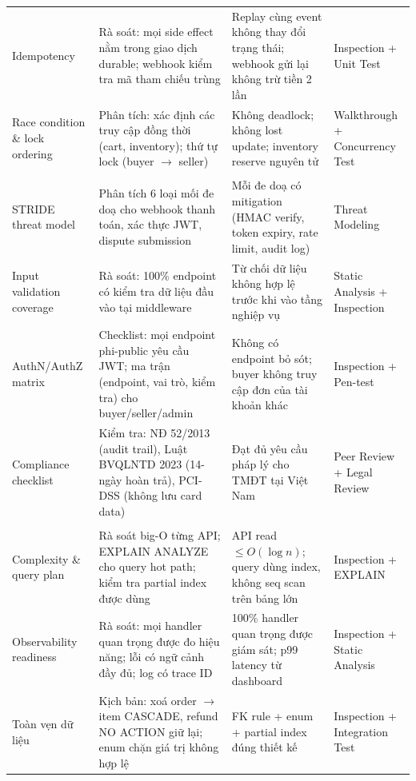 \begin{longtable}{@{}L{3.3cm}L{5.3cm}L{4.2cm}L{2.2cm}@{}}
Idempotency & Rà soát: mọi side effect nằm trong giao dịch durable; webhook kiểm tra mã tham chiếu trùng & Replay cùng event không thay đổi trạng thái; webhook gửi lại không trừ tiền 2 lần & Inspection + Unit Test \\
Race condition \& lock ordering & Phân tích: xác định các truy cập đồng thời (cart, inventory); thứ tự lock (buyer $\to$ seller) & Không deadlock; không lost update; inventory reserve nguyên tử & Walkthrough + Concurrency Test \\
\addlinespace
{} \\
STRIDE threat model & Phân tích 6 loại mối đe doạ cho webhook thanh toán, xác thực JWT, dispute submission & Mỗi đe doạ có mitigation (HMAC verify, token expiry, rate limit, audit log) & Threat Modeling \\
Input validation coverage & Rà soát: 100\% endpoint có kiểm tra dữ liệu đầu vào tại middleware & Từ chối dữ liệu không hợp lệ trước khi vào tầng nghiệp vụ & Static Analysis + Inspection \\
AuthN/AuthZ matrix & Checklist: mọi endpoint phi-public yêu cầu JWT; ma trận (endpoint, vai trò, kiểm tra) cho buyer/seller/admin & Không có endpoint bỏ sót; buyer không truy cập đơn của tài khoản khác & Inspection + Pen-test \\
Compliance checklist & Kiểm tra: NĐ 52/2013 (audit trail), Luật BVQLNTD 2023 (14-ngày hoàn trả), PCI-DSS (không lưu card data) & Đạt đủ yêu cầu pháp lý cho TMĐT tại Việt Nam & Peer Review + Legal Review \\
\addlinespace
{} \\
Complexity \& query plan & Rà soát big-O từng API; EXPLAIN ANALYZE cho query hot path; kiểm tra partial index được dùng & API read $\leq O(\log n)$; query dùng index, không seq scan trên bảng lớn & Inspection + EXPLAIN \\
Observability readiness & Rà soát: mọi handler quan trọng được đo hiệu năng; lỗi có ngữ cảnh đầy đủ; log có trace ID & 100\% handler quan trọng được giám sát; p99 latency từ dashboard & Inspection + Static Analysis \\
Toàn vẹn dữ liệu & Kịch bản: xoá order $\to$ item CASCADE, refund NO ACTION giữ lại; enum chặn giá trị không hợp lệ & FK rule + enum + partial index đúng thiết kế & Inspection + Integration Test \\

\end{longtable}
\normalsize

